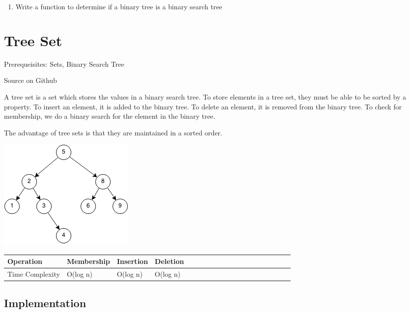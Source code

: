 \documentclass[11pt,oneside]{book}
\makeatletter
\def\maxwidth#1{\ifdim\Gin@nat@width>#1 #1\else\Gin@nat@width\fi}
\makeatother
\begin{document}
\begin{enumerate}
\item Write a function to determine if a binary tree is a binary search tree
\end{enumerate}

        \section{ Tree Set }
        

Prerequeisites: Sets, Binary Search Tree

Source on Github

A tree set is a set which stores the values in a binary search tree. To store elements in a tree set, they must be able to be sorted by a property. To insert an element, it is added to the binary tree. To delete an element, it is removed from the binary tree. To check for membership, we do a binary search for the element in the binary tree.

The advantage of tree sets is that they are maintained in a sorted order.

\vspace{5px}\includegraphics[width=\maxwidth{\textwidth}]{bst.png}

\vspace{10px}\begin{tabulary}{0.4\linewidth}{|l|l|l|l|l|l|l|l|l|l|l|l|l|l|l|l|l|l|l}\hline


  Operation &
  Membership &
  Insertion &
  Deletion\\
\hline


  Time Complexity &
  O(log n) &
  O(log n) &
  O(log n)\\

\hline\end{tabulary}

\subsection{Implementation}
\end{document}
